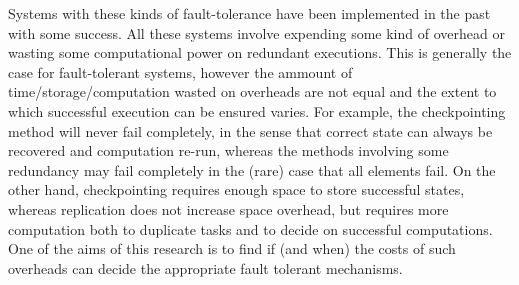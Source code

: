 Systems with these kinds of fault-tolerance have been implemented in the past \cite{ree06, lit07} with some success.
All these systems involve expending some kind of overhead or wasting some computational power on redundant executions.
This is generally the case for fault-tolerant systems, however the ammount of time/storage/computation wasted on overheads are not equal and the extent to which successful execution can be ensured varies.
For example, the checkpointing method will never fail completely, in the sense that correct state can always be recovered and computation re-run, whereas the methods involving some redundancy may fail completely in the (rare) case that all elements fail.
On the other hand, checkpointing requires enough space to store successful states, whereas replication does not increase space overhead, but requires more computation both to duplicate tasks and to decide on successful computations.
One of the aims of this research is to find if (and when) the costs of such overheads can decide the appropriate fault tolerant mechanisms.
